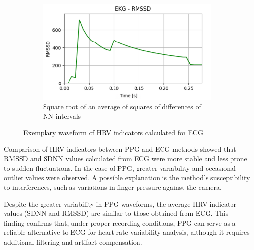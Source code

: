 \documentclass[journal]{IEEEtran}
\begin{document}
\begin{figure}[h]
    \vspace{0.2cm}  
    \begin{subfigure}{0.47\textwidth}
        \centering
        \includegraphics[width=\linewidth]{RMSSD_EKG.png}
        \caption{Square root of an average of squares of differences of NN intervals}
    \end{subfigure}  
    \caption{Exemplary waveform of HRV indicators calculated for ECG}
\end{figure}

Comparison of HRV indicators between PPG and ECG methods showed that RMSSD and SDNN values calculated from ECG were more stable and less prone to sudden fluctuations. In the case of PPG, greater variability and occasional outlier values were observed. A possible explanation is the method's susceptibility to interferences, such as variations in finger pressure against the camera.

Despite the greater variability in PPG waveforms, the average HRV indicator values (SDNN and RMSSD) are similar to those obtained from ECG. This finding confirms that, under proper recording conditions, PPG can serve as a reliable alternative to ECG for heart rate variability analysis, although it requires additional filtering and artifact compensation.
\end{document}
